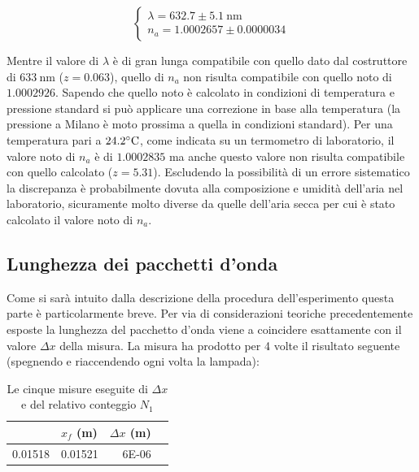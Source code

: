 \documentclass[a4paper,11pt]{article}
\begin{document}
\begin{equation}
\begin{cases}
\lambda = 632.7 \pm 5.1 \ \text{nm} \\ n_a = \num{1.0002657} \pm \num{0.0000034}
\end{cases}
\end{equation}

Mentre il valore di $\lambda$ è di gran lunga compatibile con quello dato dal costruttore di $633 \ \text{nm}$ ($z = 0.063$), quello di $n _a$ non risulta compatibile con quello noto di $1.0002926$.
Sapendo che quello noto è calcolato in condizioni di temperatura e pressione standard si può applicare una correzione in base alla temperatura (la pressione a Milano è moto prossima a quella in condizioni standard).
Per una temperatura pari a $24.2 \celsius$, come indicata su un termometro di laboratorio, il valore noto di $n _a$ è di $1.0002835$ ma anche questo valore non risulta compatibile con quello calcolato ($z = 5.31$).
Escludendo la possibilità di un errore sistematico la discrepanza è probabilmente dovuta alla composizione e umidità dell'aria nel laboratorio, sicuramente molto diverse da quelle dell'aria secca per cui è stato calcolato il valore noto di $n _a$.

\subsection{Lunghezza dei pacchetti d'onda}
Come si sarà intuito dalla descrizione della procedura dell'esperimento questa parte è particolarmente breve. Per via di considerazioni teoriche precedentemente esposte la lunghezza del pacchetto d'onda viene a coincidere esattamente con il valore $\Delta x$ della misura. La misura ha prodotto per 4 volte il risultato seguente (spegnendo e riaccendendo ogni volta la lampada):

\begin{table}[htbp]
	\centering
	\caption{Le cinque misure eseguite di $\Delta x$ e del relativo conteggio $N _1$}
	\begin{tabular}{rrrr}
		\bottomrule
		\rowcolor[rgb]{ .267,  .447,  .769} \multicolumn{1}{l}{\textcolor[rgb]{ 1,  1,  1}{\textbf{$x _i$ (m)}}} & \multicolumn{1}{l}{\textcolor[rgb]{ 1,  1,  1}{\textbf{$x _f$ (m)}}} & \multicolumn{1}{l}{\textcolor[rgb]{ 1,  1,  1}{\textbf{$\Delta x$ (m)}}} \\
		\toprule
		0.01518 & 0.01521 & 6E-06 \\
	\end{tabular}%
\end{table}%
\end{document}
